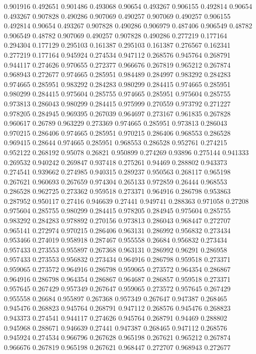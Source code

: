 0.901916 0.492651
0.901486 0.493068
0.90654 0.493267
0.906155 0.492814
0.90654 0.493267
0.907828 0.490286
0.907069 0.490257
0.907069 0.490257
0.906155 0.492814
0.90654 0.493267
0.907828 0.490286
0.906979 0.487406
0.906549 0.48782
0.906549 0.48782
0.907069 0.490257
0.907828 0.490286
0.277219 0.177164
0.294304 0.177129
0.295103 0.161387
0.295103 0.161387
0.276567 0.162341
0.277219 0.177164
0.945924 0.274534
0.947112 0.268576
0.945764 0.268791
0.944117 0.274626
0.970655 0.272377
0.966676 0.267819
0.965212 0.267874
0.968943 0.272677
0.974665 0.285951
0.984489 0.284997
0.983292 0.284283
0.974665 0.285951
0.983292 0.284283
0.980299 0.284415
0.974665 0.285951
0.980299 0.284415
0.975604 0.285755
0.974665 0.285951
0.975604 0.285755
0.973813 0.286043
0.980299 0.284415
0.975999 0.270559
0.973792 0.271227
0.978205 0.284945
0.969395 0.267039
0.964697 0.273167
0.961835 0.267828
0.960617 0.26789
0.963229 0.273369
0.974665 0.285951
0.973813 0.286043
0.970215 0.286406
0.974665 0.285951
0.970215 0.286406
0.968553 0.286528
0.969415 0.28644
0.974665 0.285951
0.968553 0.286528
0.952761 0.274215
0.952122 0.268192
0.95078 0.26821
0.950899 0.274269
0.93896 0.275144
0.941333 0.269532
0.940242 0.269847
0.937418 0.275261
0.94469 0.288802
0.943373 0.274541
0.939662 0.274985
0.940315 0.289237
0.950563 0.268117
0.965198 0.267621
0.960693 0.267659
0.974304 0.265133
0.972859 0.26444
0.968553 0.286528
0.962725 0.273362
0.959518 0.273371
0.964916 0.286798
0.953863 0.287952
0.950117 0.27416
0.946639 0.27441
0.949741 0.288363
0.971058 0.27208
0.975604 0.285755
0.980299 0.284415
0.978205 0.284945
0.975604 0.285755
0.983292 0.284283
0.978892 0.270156
0.973813 0.286043
0.968447 0.272707
0.965141 0.272974
0.970215 0.286406
0.963131 0.286992
0.956832 0.273434
0.953466 0.274019
0.958918 0.287467
0.955558 0.26684
0.956832 0.273434
0.957433 0.273553
0.955897 0.267368
0.963131 0.286992
0.96291 0.286958
0.957433 0.273553
0.956832 0.273434
0.964916 0.286798
0.959518 0.273371
0.959065 0.273572
0.964916 0.286798
0.959065 0.273572
0.964354 0.286867
0.964916 0.286798
0.964354 0.286867
0.964687 0.286857
0.959518 0.273371
0.957645 0.267429
0.957349 0.267647
0.959065 0.273572
0.957645 0.267429
0.955558 0.26684
0.955897 0.267368
0.957349 0.267647
0.947387 0.268465
0.945476 0.268823
0.945764 0.268791
0.947112 0.268576
0.945476 0.268823
0.943373 0.274541
0.944117 0.274626
0.945764 0.268791
0.94469 0.288802
0.945968 0.288671
0.946639 0.27441
0.947387 0.268465
0.947112 0.268576
0.945924 0.274534
0.966796 0.267628
0.965198 0.267621
0.965212 0.267874
0.966676 0.267819
0.965198 0.267621
0.968447 0.272707
0.968943 0.272677
